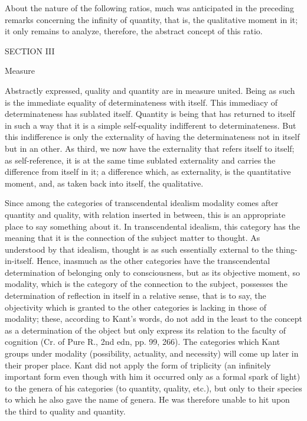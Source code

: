 About the nature of the following ratios,
much was anticipated in the preceding remarks
concerning the infinity of quantity, that is,
the qualitative moment in it;
it only remains to analyze, therefore,
the abstract concept of this ratio.

SECTION III

Measure

Abstractly expressed, quality and quantity are in measure united.
Being as such is the immediate equality of determinateness with itself.
This immediacy of determinateness has sublated itself.
Quantity is being that has returned to itself in such a way that it is
a simple self-equality indifferent to determinateness.
But this indifference is only the externality of having
the determinateness not in itself but in an other.
As third, we now have the externality that refers itself to itself;
as self-reference, it is at the same time sublated externality and
carries the difference from itself in it;
a difference which, as externality, is the quantitative moment, and,
as taken back into itself, the qualitative.

Since among the categories of transcendental idealism
modality comes after quantity and quality,
with relation inserted in between,
this is an appropriate place to say something about it.
In transcendental idealism, this category has the meaning that
it is the connection of the subject matter to thought.
As understood by that idealism, thought is as such
essentially external to the thing-in-itself.
Hence, inasmuch as the other categories have
the transcendental determination of belonging only to consciousness,
but as its objective moment,
so modality, which is the category of the connection to the subject,
possesses the determination of reflection in itself in a relative sense,
that is to say, the objectivity which is granted to the other categories
is lacking in those of modality;
these, according to Kant's words, do not add in the least to
the concept as a determination of the object but only express
its relation to the faculty of cognition
(Cr. of Pure R., 2nd edn, pp. 99, 266).
The categories which Kant groups under modality
(possibility, actuality, and necessity)
will come up later in their proper place.
Kant did not apply the form of triplicity
(an infinitely important form even though
with him it occurred only as a formal spark of light)
to the genera of his categories (to quantity, quality, etc.),
but only to their species to which he also gave the name of genera.
He was therefore unable to hit upon the third to quality and quantity.

